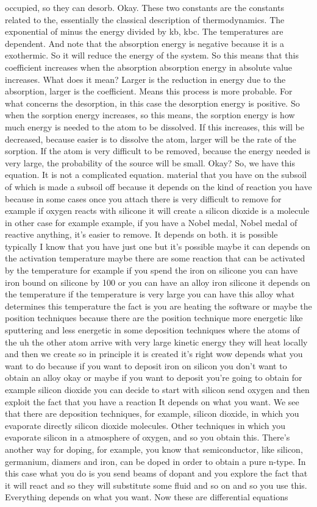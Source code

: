 occupied, so they can desorb. Okay. These two constants are the constants related to the, essentially the classical description of thermodynamics. The exponential of minus the energy divided by kb, kbc. The temperatures are dependent. And note that the absorption energy is negative because it is a exothermic. So it will reduce the energy of the system. So this means that this coefficient increases when the absorption absorption energy in absolute value increases. What does it mean? Larger is the reduction in energy due to the absorption, larger is the coefficient. Means this process is more probable. For what concerns the desorption, in this case the desorption energy is positive. So when the sorption energy increases, so this means, the sorption energy is how much energy is needed to the atom to be dissolved. If this increases, this will be decreased, because easier is to dissolve the atom, larger will be the rate of the sorption. If the atom is very difficult to be removed, because the energy needed is very large, the probability of the source will be small. Okay? So, we have this equation. It is not a complicated equation. material that you have on the subsoil of which is made a subsoil off because it depends on the kind of reaction you have because in some cases once you attach there is very difficult to remove for example if oxygen reacts with silicone it will create a silicon dioxide is a molecule in other case for example example, if you have a Nobel medal, Nobel medal of reactive anything, it's easier to remove. It depends on both. it is possible typically I know that you have just one but it's possible maybe it can depends on the activation temperature maybe there are some reaction that can be activated by the temperature for example if you spend the iron on silicone you can have iron bound on silicone by 100 or you can have an alloy iron silicone it depends on the temperature if the temperature is very large you can have this alloy what determines this temperature the fact is you are heating the software or maybe the position techniques because there are the position technique more energetic like sputtering and less energetic in some deposition techniques where the atoms of the uh the other atom arrive with very large kinetic energy they will heat locally and then we create so in principle it is created it's right wow depends what you want to do because if you want to deposit iron on silicon you don't want to obtain an alloy okay or maybe if you want to deposit you're going to obtain for example silicon dioxide you can decide to start with silicon send oxygen and then exploit the fact that you have a reaction It depends on what you want. We see that there are deposition techniques, for example, silicon dioxide, in which you evaporate directly silicon dioxide molecules. Other techniques in which you evaporate silicon in a atmosphere of oxygen, and so you obtain this. There's another way for doping, for example, you know that semiconductor, like silicon, germanium, diamers and iron, can be doped in order to obtain a pure n-type. In this case what you do is you send beams of dopant and you explore the fact that it will react and so they will substitute some fluid and so on and so you use this. Everything depends on what you want. Now these are differential equations 
